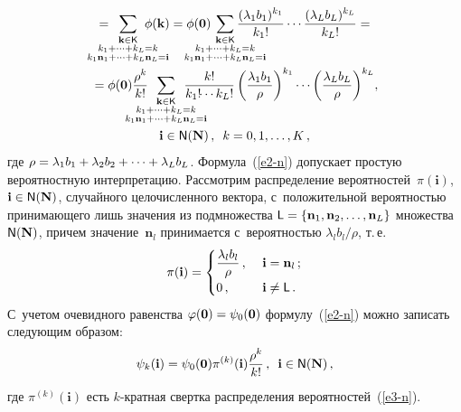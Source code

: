 \begin{multicols}{2}
\noindent
\begin{multline}
 {}= \hspace*{-20pt}
\sum\limits_{\substack{{\mathbf{k}\in{\sf K}}\\ {k_1+\cdots +
k_L=k}\\{k_1\mathbf{n}_1+\cdots +k_L\mathbf{n}_L=\mathbf{i}}}} 
\hspace*{-21pt}\phi(\mathbf{k}) =\phi(\mathbf{0}) \hspace*{-23pt}
\sum\limits_{\substack{{\mathbf{k}\in {\sf K}}\\ {k_1+\cdots +
k_L=k}\\{k_1\mathbf{n}_1+\cdots +{k}_{{L}}\mathbf{n}_{{L}}=\mathbf{i}}}} \hspace*{-20pt}
\hspace*{-4.86pt}\fr{(\lambda_1b_1)^{k_1}}{k_1!}\cdots \fr{(\lambda_L b_L)^{k_L}}{k_L!}={}\\
{}=
\phi(\mathbf{0})\fr{\rho^k}{k!} \hspace*{-20pt}
\sum\limits_{\substack{{\mathbf{k}\in {\sf K}}\\ {k_1+\cdots+ 
k_L=k}\\{k_1\mathbf{n}_1+\cdots +{k}_{{L}}\mathbf{n}_{{L}}=\mathbf{i}}}}
\hspace*{-20pt} \fr{k!}{k_1!\!\!\cdots 
k_L!} \left( \fr{\lambda_1b_1}{\rho}\right)^{k_1}\cdots \left( 
\fr{\lambda_Lb_L}{\rho}\right)^{k_L}\!, \\
  \mathbf{i}\in {\sf N}(\mathbf{N})\,, 
\enskip  k=0, 1,\ldots, K\,,
\label{e2-n}
\end{multline}
где $\rho=\lambda_1b_1\hm+ \lambda_2b_2+\cdots +\lambda_Lb_L$. 
Формула~(\ref{e2-n}) допускает простую вероятностную интерпретацию. 
Рассмотрим распределение вероятностей~$\pi(\mathbf{i})$, $\mathbf{i}\hm\in 
{\sf N}(\mathbf{N})$, случайного целочисленного вектора, с~положительной 
вероятностью принимающего лишь значения из подмножества ${\sf L} \hm= 
\{\mathbf{n}_1, \mathbf{n}_2, \ldots ,\mathbf{n}_L\}$ множества~${\sf 
N}(\mathbf{N})$, причем значение~$\mathbf{n}_l$ принимается с~вероятностью 
$\lambda_lb_l/\rho$, т.\,е. 
\begin{equation}
\pi(\mathbf{i}) =\begin{cases}
\displaystyle\frac{\displaystyle \lambda_lb_l\mathstrut}{\displaystyle \rho\mathstrut}\,, &\ \mathbf{i}=\mathbf{n}_l\,;\\
0\,, &\ \mathbf{i}\not={\sf L}\,.
\end{cases}
\label{e3-n}
\end{equation}
С~учетом очевидного равенства $\varphi(\mathbf{0})\hm= \psi_0(\mathbf{0})$ формулу~(\ref{e2-n}) 
можно записать следующим образом:
\begin{equation}
\psi_k(\mathbf{i}) =\psi_0 (\mathbf{0}) \pi^{(k)} (\mathbf{i}) \displaystyle\frac{\displaystyle \rho^k\mathstrut}{\displaystyle k!\mathstrut}\,,\enskip 
\mathbf{i}\in{\sf N}(\mathbf{N})\,,
\label{e4-n}
\end{equation}
где $\pi^{(k)}(\mathbf{i})$ есть $k$-крат\-ная свертка распределения 
вероятностей~(\ref{e3-n}).
  

\end{multicols}
